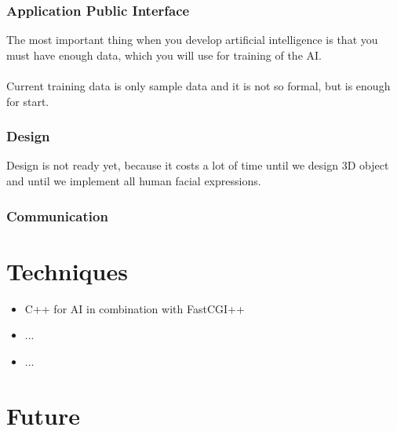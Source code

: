 \documentclass[a4paper, 12pt]{article}
\begin{document}
			\subsubsection{Application Public Interface}
				The most important thing when you develop artificial intelligence is that you must have enough data, which you will use for training of the AI. \\ \\
				Current training data is only sample data and it is not so formal, but is enough for start.
			\subsubsection{Design}
				Design is not ready yet, because it costs a lot of time until we design 3D object and until we implement all human facial expressions. 
			\subsubsection{Communication}
	\section{Techniques}
	\begin{itemize}
		\item C++ for AI in combination with FastCGI++
		\item ...
		\item ...
	\end{itemize}
	\section{Future}
\end{document}
